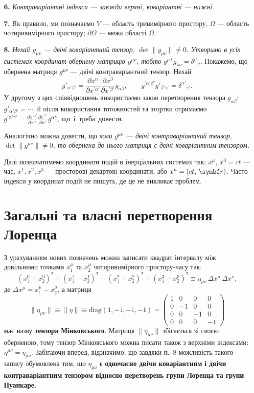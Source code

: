 \documentclass[%
biblatex,
]{ConspectBook}
\begin{document}
\textbf{6.} \textit{Контраваріантні індекси --- завжди верхні,
коваріантні --- нижні.}

\textbf{7.} Як правило, ми позначаємо $V$ --- область тривимірного
простору, $\Omega$ --- область чотиривимірного простору; $\partial\Omega$
--- межа області $\Omega$.

\textbf{8.} \textit{Нехай $g_{\mu\nu}$ --- двічі коваріантний тензор,
$\det\|g_{\mu\nu}\| \ne 0$. Утворимо в усіх системах координат обернену
матрицю $g^{\mu\nu}$, тобто $g^{\mu\lambda}g_{\lambda\nu} = \delta^\mu{}_\nu$.}
Покажемо, що обернена матриця $g^{\mu\nu}$ --- двічі контраваріантний тензор.
Нехай
\[
  g'_{\alpha'\beta'} = \frac{\partial x^\alpha}{\partial x^{\prime\alpha'}}
                       \frac{\partial x^\beta}{\partial x^{\prime\beta'}}
                       g_{\alpha\beta},\qquad
  g^{\prime\alpha'\beta'} g'_{\beta'\gamma'} = \delta^{\alpha'}{}_{\gamma'}.
\]
У другому з цих співвідношень використаємо закон перетворення тензора
$g_{\alpha\beta}$: $g'_{\alpha'\beta'} = \cdots$, й після використання тотожностей
та згортки отримаємо $g^{\prime\alpha'\gamma'} = \frac{\partial x^{\prime\alpha'}}{\partial x^\alpha}
\frac{\partial x^{\prime\gamma'}}{\partial x^\gamma} g^{\alpha\gamma}$, що~і~треба~довести.

Аналогічно можна довести, що \textit{коли $g^{\mu\nu}$ --- двічі
контраваріантний тензор, $\det\|g^{\mu\nu}\| \ne 0$, то обернена до нього
матриця є двічі коваріантним тензором.}

Далі позначатимемо координати подій в інерціальних системах так:
$x^\mu$, $x^0 = ct$ --- час, $x^1, x^2, x^3$ --- просторові декартові координати,
або $x^\mu = (ct,\,\vect{r})$.
Часто індекси у координат подій не пишуть, де це не викликає проблем.

\section{Загальні та власні перетворення Лоренца}

З урахуванням нових позначень можна записати квадрат інтервалу між
довільними точками $x_1^\mu$ та $x_2^\mu$ чотиривимірного простору-часу так:
\[
  (x_1^0-x_2^0)^2 - (x_1^1-x_2^1)^2 - (x_1^2-x_2^2)^2 - (x_1^3-x_2^3)^2
  \equiv \eta_{\mu\nu}\,\Delta x^\mu\,\Delta x^\nu,
\]
де $\Delta x^\mu = x_1^\mu - x_2^\mu$, а матриця
\[
  \|\eta_{\mu\nu}\| \equiv \|\eta\| \equiv \mathrm{diag}(1,-1,-1,-1) =
  \begin{pmatrix}
    1 & 0 & 0 & 0\\
    0 &-1 & 0 & 0\\
    0 & 0 &-1 & 0\\
    0 & 0 & 0 &-1
  \end{pmatrix}
\]
має назву \textbf{тензора Мінковського}. Матриця $\|\eta_{\mu\nu}\|$ збігається
зі своєю оберненою, тому тензор Мінковського можна писати також з верхніми
індексами: $\eta^{\mu\nu} = \eta_{\mu\nu}$. Забігаючи вперед, відзначимо, що
завдяки п.~8 можливість такого запису обумовлена тим, що $\eta_{\mu\nu}$
\textbf{є одночасно двічи коваріантним і двічи контраваріантним тензором
відносно перетворень групи Лоренца та групи Пуанкаре.}
\end{document}
